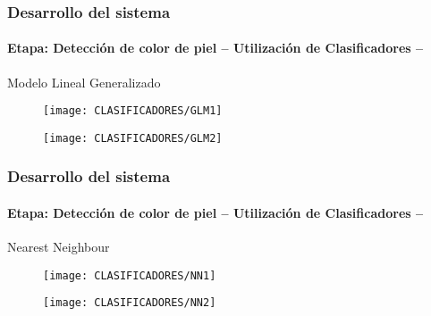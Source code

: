 \documentclass[xcolor=dvipsnames]{beamer}
\begin{document}
	\begin{frame}
		\transdissolve
		\frametitle{Desarrollo del sistema}
		\framesubtitle{Etapa: Detección de color de piel -- Utilización de Clasificadores -- }
		Modelo Lineal Generalizado 
		\begin{center}
			\begin{minipage}[c]{.45\textwidth}
				\begin{figure}[h]
					\texttt{[image: CLASIFICADORES/GLM1]}
				\end{figure}
			\end{minipage}
			\begin{minipage}[c]{.45\textwidth}
				\begin{figure}[h]
					\texttt{[image: CLASIFICADORES/GLM2]}
				\end{figure}
			\end{minipage}
		\end{center}
	\end{frame}

	\begin{frame}
		\transdissolve
		\frametitle{Desarrollo del sistema}
		\framesubtitle{Etapa: Detección de color de piel -- Utilización de Clasificadores -- }
		Nearest Neighbour
		\begin{center}
			\begin{minipage}[c]{.45\textwidth}
				\begin{figure}[h]
					\texttt{[image: CLASIFICADORES/NN1]}
				\end{figure}
			\end{minipage}
			\begin{minipage}[c]{.45\textwidth}
				\begin{figure}[h]
					\texttt{[image: CLASIFICADORES/NN2]}
				\end{figure}
			\end{minipage}
		\end{center}
	\end{frame}
	
\end{document}
